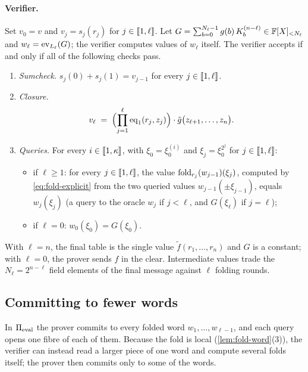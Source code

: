\paragraph{Verifier.}
Set $v_0 = v$ and $v_j = s_j(r_j)$ for $j \in \llbracket 1, \ell \rrbracket$.
Let $G = \sum_{b=0}^{N_\ell - 1} g(b)\, K^{(n-\ell)}_b \in \mathbb{F}[X]_{<N_\ell}$ and $w_\ell = \mathrm{ev}_{L_\ell}(G)$; the verifier computes values of $w_\ell$ itself.
The verifier accepts if and only if all of the following checks pass.
\begin{enumerate}
  \item \emph{Sumcheck.} $s_j(0) + s_j(1) = v_{j-1}$ for every $j \in \llbracket 1, \ell \rrbracket$.
  \item \emph{Closure.}
  \[
    v_\ell \;=\; \Bigl(\prod_{j=1}^{\ell} \mathrm{eq}_1(r_j, z_j)\Bigr)\cdot \tilde g\bigl(z_{\ell+1},\dots,z_{n}\bigr).
  \]
  \item \emph{Queries.} For every $i \in \llbracket 1, \kappa \rrbracket$, with $\xi_0 = \xi^{(i)}_0$ and $\xi_j = \xi_0^{2^j}$ for $j \in \llbracket 1, \ell \rrbracket$:
  \begin{itemize}
    \item if $\ell \ge 1$: for every $j \in \llbracket 1, \ell \rrbracket$, the value $\mathrm{fold}_{r_j}(w_{j-1})(\xi_j)$, computed by \eqref{eq:fold-explicit} from the two queried values $w_{j-1}(\pm\xi_{j-1})$, equals $w_j(\xi_j)$ (a query to the oracle $w_j$ if $j < \ell$, and $G(\xi_\ell)$ if $j = \ell$);
    \item if $\ell = 0$: $w_0(\xi_0) = G(\xi_0)$.
  \end{itemize}
\end{enumerate}

\begin{remark}\label{rem:stop}
With $\ell = n$, the final table is the single value $\tilde f(r_1,\dots,r_n)$ and $G$ is a constant; with $\ell = 0$, the prover sends $f$ in the clear.
Intermediate values trade the $N_\ell = 2^{n-\ell}$ field elements of the final message against $\ell$ folding rounds.
\end{remark}

\subsection{Committing to fewer words}\label{sec:pcs:skip}

In $\Pi_{\mathrm{eval}}$ the prover commits to every folded word $w_1,\dots,w_{\ell-1}$, and each query opens one fibre of each of them.
Because the fold is local (\cref{lem:fold-word}(3)), the verifier can instead read a larger piece of one word and compute several folds itself; the prover then commits only to some of the words.

